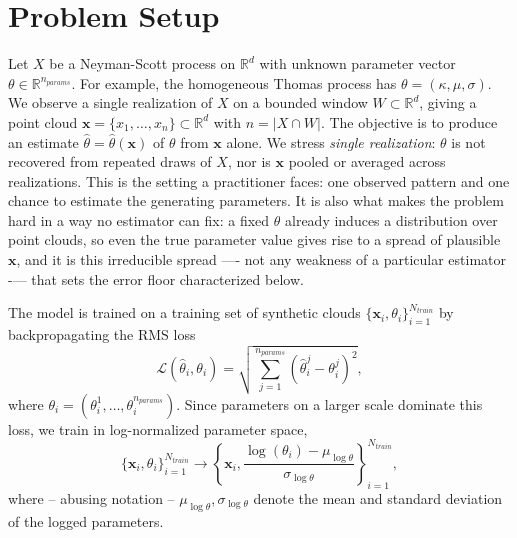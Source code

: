 \documentclass[11pt,letterpaper]{article}
\newcommand{\R}{\mathbb{R}}
\newcommand{\1}{\mathds{1}}
\newcommand{\pc}{\mathbf{x}}
\theoremstyle{plain}
\theoremstyle{definitioncolon}
\begin{document}
\section{Problem Setup}
\label{sec:problem}

Let $X$ be a Neyman-Scott process on $\R^d$ with unknown parameter vector
$\theta \in \R^{n_{params}}$. For example, the homogeneous Thomas process has 
$\theta = (\kappa, \mu, \sigma)$. We observe a single realization of $X$ on a 
bounded window $W \subset \R^d$, giving a point cloud
$\pc = \{x_1, \dots, x_n\} \subset \R^d$ with $n = |X \cap W|$. The objective is to 
produce an estimate $\hat\theta = \hat\theta(\pc)$ of $\theta$ from $\pc$ alone.
We stress \emph{single realization}: $\theta$ is not recovered from repeated draws of $X$, nor 
is $\pc$ pooled or averaged across realizations. This is the setting a practitioner
faces: one observed pattern and one chance to estimate the generating parameters.
It is also what makes the problem hard in a way no estimator can fix: a 
fixed $\theta$ already induces a distribution over point clouds, so even the true 
parameter value gives rise to a spread of plausible $\pc$, and it is this irreducible 
spread —- not any weakness of a particular estimator -— that sets the error floor 
characterized below.

The model is trained on a training set of synthetic clouds
$\{\pc_i, \theta_i\}_{i=1}^{N_{train}}$ by backpropagating the RMS loss
    \[
    \mathcal{L}(\hat\theta_i, \theta_i) = \sqrt{\sum_{j=1}^{n_{params}}(\hat\theta^j_i - \theta^j_i)^2},
    \]
where $\theta_i = (\theta_i^1, \dots, \theta_i^{n_{params}})$. Since parameters on a larger scale
dominate this loss, we train in log-normalized parameter space,
    \[
    \{\pc_i, \theta_i\}_{i=1}^{N_{train}} \rightarrow
    \left\{\pc_i, \frac{\log(\theta_i) - \mu_{\log\theta}}
    {\sigma_{\log\theta}}\right\}_{i=1}^{N_{train}},
    \]
where -- abusing notation -- $\mu_{\log\theta}, \sigma_{\log\theta}$ denote the
mean and standard deviation of the logged parameters.
\end{document}
